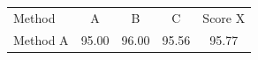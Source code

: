 \documentclass{article}
\begin{document}
\begin{tabular}{lcccc}
Method & A & B & C & Score X \\
Method A & 95.00 & 96.00 & 95.56 & 95.77 \\
\end{tabular}
\end{document}
